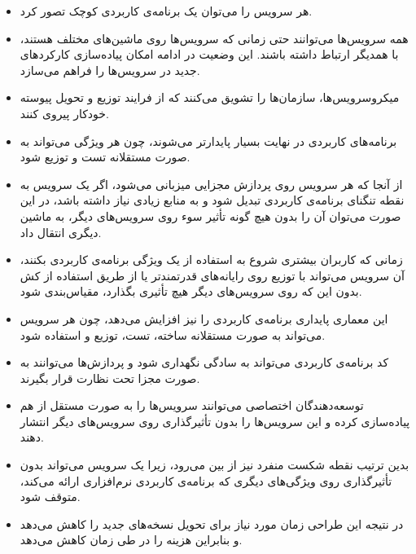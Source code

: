 \begin{itemize}
	
	\item هر سرویس را می‌توان یک برنامه‌ی کاربردی کوچک تصور کرد.
	
	\item همه سرویس‌ها می‌توانند حتی زمانی که سرویس‌ها روی ماشین‌های مختلف هستند، با همدیگر ارتباط داشته باشند. این وضعیت در ادامه امکان پیاده‌سازی کارکردهای جدید در سرویس‌ها را فراهم می‌سازد.
	
	\item میکروسرویس‌ها، سازمان‌ها را تشویق می‌کنند که از فرایند توزیع و تحویل پیوسته خودکار پیروی کنند.
	
	\item برنامه‌های کاربردی‌ در نهایت بسیار پایدارتر می‌شوند، چون هر ویژگی می‌تواند به صورت مستقلانه تست و توزیع شود.
	
	\item از آنجا که هر سرویس روی پردازش مجزایی میزبانی می‌شود، اگر یک سرویس به نقطه تنگنای برنامه‌ی کاربردی تبدیل شود و به منابع زیادی نیاز داشته باشد، در این صورت می‌توان آن را بدون هیچ گونه تأثیر سوء روی سرویس‌های دیگر، به ماشین دیگری انتقال داد.
	
	\item زمانی که کاربران بیشتری شروع به استفاده از یک ویژگی برنامه‌ی کاربردی بکنند، آن سرویس می‌تواند با توزیع روی رایانه‌های قدرتمندتر یا از طریق استفاده از کش بدون این که روی سرویس‌های دیگر هیچ تأثیری بگذارد، مقیاس‌بندی شود.
	
	\item این معماری پایداری برنامه‌ی کاربردی را نیز افزایش می‌دهد، چون هر سرویس می‌تواند به صورت مستقلانه ساخته، تست، توزیع و استفاده شود.
	
	\item کد برنامه‌ی کاربردی می‌تواند به سادگی نگهداری شود و پردازش‌ها می‌توانند به صورت مجزا تحت نظارت قرار بگیرند.
	
	\item توسعه‌دهندگان اختصاصی می‌توانند سرویس‌ها را به صورت مستقل از هم پیاده‌سازی کرده و این سرویس‌ها را بدون تأثیرگذاری روی سرویس‌های دیگر انتشار دهند.
	
	\item بدین ترتیب نقطه شکست منفرد نیز از بین می‌رود، زیرا یک سرویس می‌تواند بدون تأثیرگذاری روی ویژگی‌های دیگری که برنامه‌ی کاربردی نرم‌افزاری ارائه می‌کند، متوقف شود.
	
	\item در نتیجه این طراحی زمان مورد نیاز برای تحویل نسخه‌های جدید را کاهش می‌دهد و بنابراین هزینه را در طی زمان کاهش می‌دهد.
	

\end{itemize}
